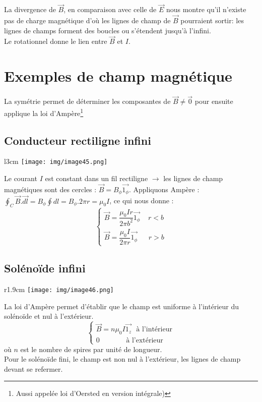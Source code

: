 \documentclass	[11pt, a4paper, openany]{book}
\begin{document}
La divergence de $\vec{B}$, en comparaison avec celle de $\vec{E}$ nous montre qu'il n'existe pas de charge magnétique d'où les lignes de champ de $\vec{B}$ pourraient sortir: les lignes de champs forment des boucles ou s'étendent jusqu'à l'infini.\\
Le rotationnel donne le lien entre $\vec{B}$ et $I$.



\section{Exemples de champ magnétique}
La symétrie permet de déterminer les composantes de $\vec{B} \neq \vec 0$ pour ensuite applique la loi d'Ampère\footnote{Aussi appelée loi d'Oersted en version intégrale)}

\subsection{Conducteur rectiligne infini}
\begin{wrapfigure}[4]{l}{3cm}
\texttt{[image: img/image45.png]}
\end{wrapfigure}
Le courant $I$ est constant dans un fil rectiligne $\rightarrow$ les lignes de champ magnétiques sont des cercles : $\vec{B} = B_\phi \vec{1_\phi}$. Appliquons  Ampère : \\
$\oint_C \vec{B}.\vec{dl} = B_\phi \oint dl = B_\phi.2\pi r = \mu_0I$, ce qui nous donne :
\begin{equation}
\left\{\begin{array}{l}
\vec{B} = \dfrac{\mu_0 I r}{2\pi b^2}\vec{1_\phi}\ \ \ \ \ r < b\\
\vec{B} = \dfrac{\mu_0I}{2\pi r}\vec{1_\phi}\ \ \ \ \ \ \ r > b
\end{array}\right.
\end{equation}


\subsection{Solénoïde infini}
\begin{wrapfigure}[9]{r}{1.9cm}
\texttt{[image: img/image46.png]}
\end{wrapfigure}

La loi d'Ampère permet d'établir que le champ est uniforme à l'intérieur du solénoïde et nul à l'extérieur.
\begin{equation}
\left\{\begin{array}{l}
\vec{B} = n\mu_0 I \vec{1_z}\ \ \ \text{à l'intérieur}\\
0 \ \ \ \ \ \ \ \ \ \ \ \ \ \ \ \ \ \text{à l'extérieur}
\end{array}\right.
\end{equation}
où $n$ est le nombre de spires par unité de longueur.\\
Pour le solénoïde fini, le champ est non nul à l'extérieur, les lignes de champ devant se refermer.
\end{document}
